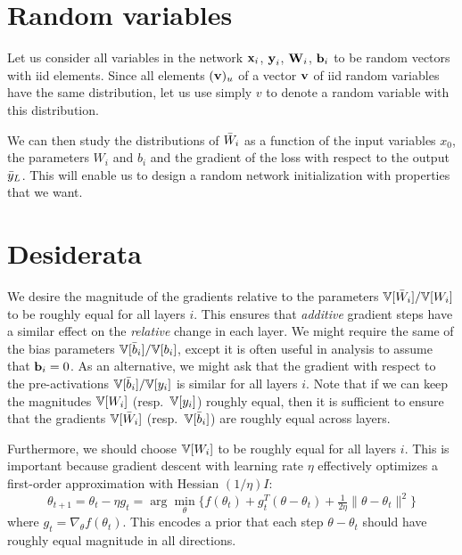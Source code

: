 \section{Random variables}

Let us consider all variables in the network $\boldsymbol{\mathbf{x}}_{i}$, $\boldsymbol{\mathbf{y}}_{i}$, $\boldsymbol{\mathbf{W}}_{i}$, $\boldsymbol{\mathbf{b}}_{i}$ to be random vectors with iid elements.
Since all elements $(\boldsymbol{\mathbf{v}})_{u}$ of a vector $\boldsymbol{\mathbf{v}}$ of iid random variables have the same distribution, let us use simply $v$ to denote a random variable with this distribution.

We can then study the distributions of $\bar{W}_{i}$ as a function of the input variables $x_{0}$, the parameters $W_{i}$ and $b_{i}$ and the gradient of the loss with respect to the output $\bar{y}_{L}$.
This will enable us to design a random network initialization with properties that we want.




\section{Desiderata}

We desire the magnitude of the gradients relative to the parameters $\mathbb{V}[\bar{W}_{i}] / \mathbb{V}[W_{i}]$ to be roughly equal for all layers $i$.
This ensures that \emph{additive} gradient steps have a similar effect on the \emph{relative} change in each layer.
We might require the same of the bias parameters $\mathbb{V}[\bar{b}_{i}] / \mathbb{V}[b_{i}]$, except it is often useful in analysis to assume that $\boldsymbol{\mathbf{b}}_{i} = 0$.
As an alternative, we might ask that the gradient with respect to the pre-activations $\mathbb{V}[\bar{b}_{i}] / \mathbb{V}[y_{i}]$ is similar for all layers $i$.
Note that if we can keep the magnitudes $\mathbb{V}[W_{i}]$ (resp.\ $\mathbb{V}[y_{i}]$) roughly equal, then it is sufficient to ensure that the gradients $\mathbb{V}[\bar{W}_{i}]$ (resp.\ $\mathbb{V}[\bar{b}_{i}]$) are roughly equal across layers.

Furthermore, we should choose $\mathbb{V}[W_{i}]$ to be roughly equal for all layers $i$.
This is important because gradient descent with learning rate $\eta$ effectively optimizes a first-order approximation with Hessian $(1/\eta) I$:
\begin{equation}
\theta_{t+1} = \theta_{t} - \eta g_{t}
= \arg \min_{\theta} \{ f(\theta_{t}) + g_{t}^{T} (\theta - \theta_{t}) + \tfrac{1}{2 \eta} \| \theta - \theta_{t} \|^{2} \}
\end{equation}
where $g_{t} = \nabla_{\theta} f(\theta_{t})$.
This encodes a prior that each step $\theta - \theta_{t}$ should have roughly equal magnitude in all directions.

